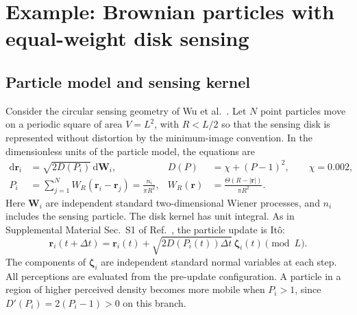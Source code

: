 \documentclass{article}
\begin{document}


\section{Example: Brownian particles with equal-weight disk sensing}
\label{sec:wuDiskSensing}

\subsection{Particle model and sensing kernel}

Consider the circular sensing geometry of Wu et al.~\cite{Wu2026NonlocalSensing}. Let $N$ point particles move on a periodic square of area $V=L^2$, with $R<L/2$ so that the sensing disk is represented without distortion by the minimum-image convention. In the dimensionless units of the particle model, the equations are
\begin{align}
    \mathrm d\mathbf r_i&=\sqrt{2D(P_i)}\,\mathrm d\mathbf W_i,
    & D(P)&=\chi+(P-1)^2, \qquad \chi=0.002,\\
    P_i&=\sum_{j=1}^N W_R(\mathbf r_i-\mathbf r_j)
        =\frac{n_i}{\pi R^2},
    & W_R(\mathbf r)&=\frac{\Theta(R-|\mathbf r|)}{\pi R^2}.
    \label{eq:wuParticle}
\end{align}
Here $\mathbf W_i$ are independent standard two-dimensional Wiener processes, and $n_i$ includes the sensing particle. The disk kernel has unit integral. As in Supplemental Material Sec.~S1 of Ref.~\cite{Wu2026NonlocalSensing}, the particle update is It\^{o}:
\begin{equation}
    \mathbf r_i(t+\Delta t)
    =\mathbf r_i(t)+\sqrt{2D(P_i(t))\Delta t}\,\boldsymbol\zeta_i(t)
    \pmod L.
    \label{eq:wuEulerMaruyama}
\end{equation}
The components of $\boldsymbol\zeta_i$ are independent standard normal variables at each step. All perceptions are evaluated from the pre-update configuration. A particle in a region of higher perceived density becomes more mobile when $P_i>1$, since $D'(P_i)=2(P_i-1)>0$ on this branch.
\end{document}
